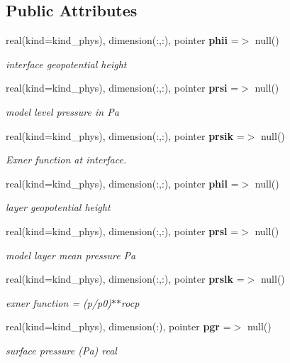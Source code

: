 \subsection*{Public Attributes}
\begin{DoxyCompactItemize}
\item 
real(kind=kind\+\_\+phys), dimension(\+:,\+:), pointer \textbf{ phii} =$>$ null()
\begin{DoxyCompactList}\small\item\em interface geopotential height \end{DoxyCompactList}\item 
real(kind=kind\+\_\+phys), dimension(\+:,\+:), pointer \textbf{ prsi} =$>$ null()
\begin{DoxyCompactList}\small\item\em model level pressure in Pa \end{DoxyCompactList}\item 
real(kind=kind\+\_\+phys), dimension(\+:,\+:), pointer \textbf{ prsik} =$>$ null()
\begin{DoxyCompactList}\small\item\em Exner function at interface. \end{DoxyCompactList}\item 
real(kind=kind\+\_\+phys), dimension(\+:,\+:), pointer \textbf{ phil} =$>$ null()
\begin{DoxyCompactList}\small\item\em layer geopotential height \end{DoxyCompactList}\item 
real(kind=kind\+\_\+phys), dimension(\+:,\+:), pointer \textbf{ prsl} =$>$ null()
\begin{DoxyCompactList}\small\item\em model layer mean pressure Pa \end{DoxyCompactList}\item 
real(kind=kind\+\_\+phys), dimension(\+:,\+:), pointer \textbf{ prslk} =$>$ null()
\begin{DoxyCompactList}\small\item\em exner function = (p/p0)$\ast$$\ast$rocp \end{DoxyCompactList}\item 
real(kind=kind\+\_\+phys), dimension(\+:), pointer \textbf{ pgr} =$>$ null()
\begin{DoxyCompactList}\small\item\em surface pressure (Pa) real \end{DoxyCompactList}\item 

\end{DoxyCompactItemize}
